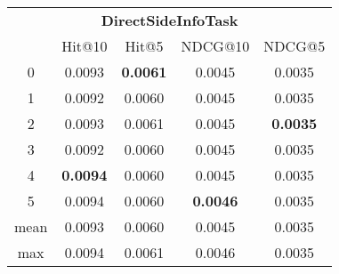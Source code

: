 \documentclass{article}
\begin{document}
 

\begin{tabular}{c|cccc}

\multicolumn{5}{c}{\textbf{DirectSideInfoTask}} \\
\noalign{\smallskip}
\noalign{\smallskip}
\toprule
\multicolumn{1}{c}{Template ID}	&	\multicolumn{1}{|c}{Hit@10}	&	\multicolumn{1}{c}{Hit@5}	&	\multicolumn{1}{c}{NDCG@10}	&	\multicolumn{1}{c}{NDCG@5}\\
\midrule
0	&	0.0093	&	\textbf{0.0061}	&	0.0045	&	0.0035\\
1	&	0.0092	&	0.0060	&	0.0045	&	0.0035\\
2	&	0.0093	&	0.0061	&	0.0045	&	\textbf{0.0035}\\
3	&	0.0092	&	0.0060	&	0.0045	&	0.0035\\
4	&	\textbf{0.0094}	&	0.0060	&	0.0045	&	0.0035\\
5	&	0.0094	&	0.0060	&	\textbf{0.0046}	&	0.0035\\
\midrule
mean	&	0.0093	&	0.0060	&	0.0045	&	0.0035\\
max	&	0.0094	&	0.0061	&	0.0046	&	0.0035\\
\bottomrule

\end{tabular}
\end{document}
